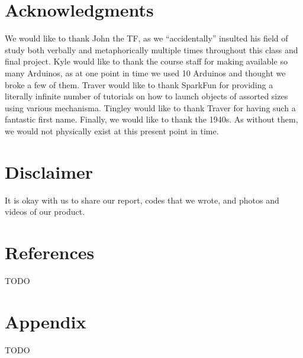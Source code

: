 \documentclass{es50report}
\begin{document}
    \section{Acknowledgments}
        We would like to thank John the TF, as we ``accidentally'' insulted his field of study both verbally and metaphorically multiple times throughout this class and final project. Kyle would like to thank the course staff for making available so many Arduinos, as at one point in time we used 10 Arduinos and thought we broke a few of them. Traver would like to thank SparkFun for providing a literally infinite number of tutorials on how to launch objects of assorted sizes using various mechanisma. Tingley would like to thank Traver for having such a fantastic first name. Finally, we would like to thank the 1940s. As without them, we would not physically exist at this present point in time.

    \section{Disclaimer}
        It is okay with us to share our report, codes that we wrote, and photos and videos of our product.

    \section{References}
    TODO

    \appendix
    \section{Appendix}
    TODO
\end{document}
